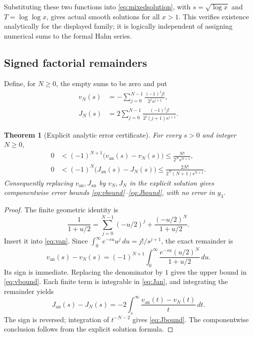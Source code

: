\documentclass[11pt,a4paper]{article}
\numberwithin{equation}{section}
\newtheorem{theorem}{Theorem}[section]
\theoremstyle{definition}
\theoremstyle{remark}\newtheorem{remark}[theorem]{Remark}
\begin{document}
Substituting these two functions into \eqref{eq:mixedsolution}, with
$s=\sqrt{\log x}$ and $T=\log\log x$, gives actual smooth solutions for all $x>1$. This verifies existence analytically for the displayed family; it is logically independent of assigning numerical sums to the formal Hahn series.

\subsection{Signed factorial remainders}
Define, for $N\ge0$, the empty sums to be zero and put
\begin{align}
 v_N(s)&=-\sum_{j=0}^{N-1}\frac{(-1)^j j!}{2^j s^{j+1}},\label{eq:vN}\\
 J_N(s)&=2\sum_{j=0}^{N-1}\frac{(-1)^j j!}{2^j(j+1)s^{j+1}}.\label{eq:JN}
\end{align}

\begin{theorem}[Explicit analytic error certificate]
\label{thm:error}
For every $s>0$ and integer $N\ge0$,
\begin{align}
 0&<(-1)^{N+1}\bigl(v_{\mathrm{an}}(s)-v_N(s)\bigr)
 \le \frac{N!}{2^Ns^{N+1}},\label{eq:vbound}\\
 0&<(-1)^N\bigl(J_{\mathrm{an}}(s)-J_N(s)\bigr)
 \le \frac{2N!}{2^N(N+1)s^{N+1}}.\label{eq:Jbound}
\end{align}
Consequently replacing $v_{\mathrm{an}},J_{\mathrm{an}}$ by $v_N,J_N$ in the explicit solution gives componentwise error bounds \eqref{eq:vbound}--\eqref{eq:Jbound}, with no error in $y_3$.
\end{theorem}
\begin{proof}
The finite geometric identity is
\[
 \frac1{1+u/2}=\sum_{j=0}^{N-1}(-u/2)^j
              +\frac{(-u/2)^N}{1+u/2}.
\]
Insert it into \eqref{eq:van}. Since
$\int_0^\infty e^{-su}u^j\,du=j!/s^{j+1}$, the exact remainder is
\begin{equation}
 v_{\mathrm{an}}(s)-v_N(s)
 =(-1)^{N+1}\int_0^\infty
             \frac{e^{-su}(u/2)^N}{1+u/2}\,du.
 \label{eq:vexactremainder}
\end{equation}
Its sign is immediate. Replacing the denominator by $1$ gives the upper bound in \eqref{eq:vbound}. Each finite term is integrable in \eqref{eq:Jan}, and integrating the remainder yields
\[
 J_{\mathrm{an}}(s)-J_N(s)
 =-2\int_s^\infty\frac{v_{\mathrm{an}}(t)-v_N(t)}t\,dt.
\]
The sign is reversed; integration of $t^{-N-2}$ gives \eqref{eq:Jbound}. The componentwise conclusion follows from the explicit solution formula.
\end{proof}
\end{document}
